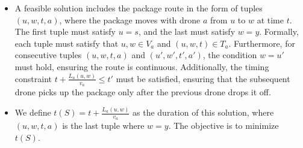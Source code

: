 \begin{itemize}
\item A feasible solution includes the package route in the form of tuples $(u, w, t, a)$, where the package moves with drone $a$ from $u$ to $w$ at time $t$. The first tuple must satisfy $u = s$, and the last must satisfy $w = y$.  
Formally, each tuple must satisfy that $u, w \in V_a$ and $(u, w, t) \in T_a$. 
Furthermore, for consecutive tuples $(u, w, t, a)$ and $(u', w', t', a')$, the condition $w = u'$ must hold, ensuring the route is continuous. Additionally, the timing constraint $t + \frac{L_a(u, w)}{v_a} \leq t'$ must be satisfied, ensuring that the subsequent drone picks up the package only after the previous drone drops it off.

\item  We define $t(S) = t + \frac{L_a(u, w)}{v_{a}}$ as the duration of this solution, where $(u, w, t, a)$ is the last tuple where $w= y$. The objective is to minimize $t(S)$.
\end{itemize}







